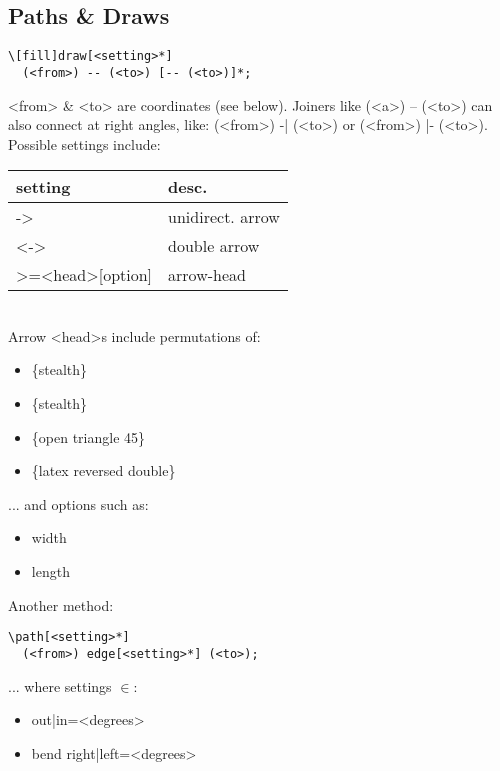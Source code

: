 \subsection*{Paths \& Draws}
\begin{code}{6.5}
\begin{lstlisting}
\[fill]draw[<setting>*]
  (<from>) -- (<to>) [-- (<to>)]*;
\end{lstlisting}
\end{code}
<from> \& <to> are coordinates (see below). Joiners like (<a>) -- (<to>) can also connect at right angles, like: (<from>) -| (<to>) or (<from>) |- (<to>). Possible settings include: \\
\begin{tabularx}{4cm}{l l}
    setting & desc. \\
    \hline
    -> & unidirect. arrow \\
    <-> & double arrow \\
    >={<head>[option]} & arrow-head \\ 
\end{tabularx} \\
Arrow <head>s include permutations of:
\begin{itemize}
    \item \{stealth\}
    \item \{stealth\textquotesingle\}
    \item \{open triangle 45\}
    \item \{latex reversed double\}
\end{itemize}
... and options such as: 
\begin{itemize}
    \item width
    \item length
\end{itemize}
\begin{code}{6.5}
Another method:
\begin{lstlisting}
\path[<setting>*]
  (<from>) edge[<setting>*] (<to>);
\end{lstlisting}
... where settings $\in$: \\
\begin{itemize}
    \item out|in=<degrees>
    \item bend right|left=<degrees>
\end{itemize}
\end{code}

\ \\

